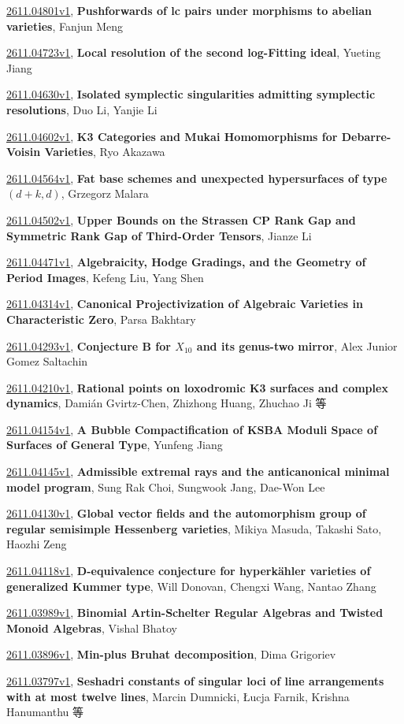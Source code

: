 \documentclass[9pt, a4paper]{article}
\theoremstyle{plain}
\theoremstyle{definition}
\theoremstyle{remark}
\newcommand{\arxiv}[3]{\href{https://arxiv.org/abs/#1}{#1}, \textbf{\textcolor{arxivblue}{#2}}, #3}
\begin{document}
\arxiv{2611.04801v1}{Pushforwards of lc pairs under morphisms to abelian varieties}{Fanjun Meng}

\arxiv{2611.04723v1}{Local resolution of the second log-Fitting ideal}{Yueting Jiang}

\arxiv{2611.04630v1}{Isolated symplectic singularities admitting symplectic resolutions}{Duo Li, Yanjie Li}

\arxiv{2611.04602v1}{K3 Categories and Mukai Homomorphisms for Debarre-Voisin Varieties}{Ryo Akazawa}

\arxiv{2611.04564v1}{Fat base schemes and unexpected hypersurfaces of type $(d+k,d)$}{Grzegorz Malara}

\arxiv{2611.04502v1}{Upper Bounds on the Strassen CP Rank Gap and Symmetric Rank Gap of Third-Order Tensors}{Jianze Li}

\arxiv{2611.04471v1}{Algebraicity, Hodge Gradings, and the Geometry of Period Images}{Kefeng Liu, Yang Shen}

\arxiv{2611.04314v1}{Canonical Projectivization of Algebraic Varieties in Characteristic Zero}{Parsa Bakhtary}

\arxiv{2611.04293v1}{Conjecture B for $X_{10}$ and its genus-two mirror}{Alex Junior Gomez Saltachin}

\arxiv{2611.04210v1}{Rational points on loxodromic K3 surfaces and complex dynamics}{Damián Gvirtz-Chen, Zhizhong Huang, Zhuchao Ji 等}

\arxiv{2611.04154v1}{A Bubble Compactification of KSBA Moduli Space of Surfaces of General Type}{Yunfeng Jiang}

\arxiv{2611.04145v1}{Admissible extremal rays and the anticanonical minimal model program}{Sung Rak Choi, Sungwook Jang, Dae-Won Lee}

\arxiv{2611.04130v1}{Global vector fields and the automorphism group of regular semisimple Hessenberg varieties}{Mikiya Masuda, Takashi Sato, Haozhi Zeng}

\arxiv{2611.04118v1}{D-equivalence conjecture for hyperkähler varieties of generalized Kummer type}{Will Donovan, Chengxi Wang, Nantao Zhang}

\arxiv{2611.03989v1}{Binomial Artin-Schelter Regular Algebras and Twisted Monoid Algebras}{Vishal Bhatoy}

\arxiv{2611.03896v1}{Min-plus Bruhat decomposition}{Dima Grigoriev}

\arxiv{2611.03797v1}{Seshadri constants of singular loci of line arrangements with at most twelve lines}{Marcin Dumnicki, Łucja Farnik, Krishna Hanumanthu 等}
\end{document}

